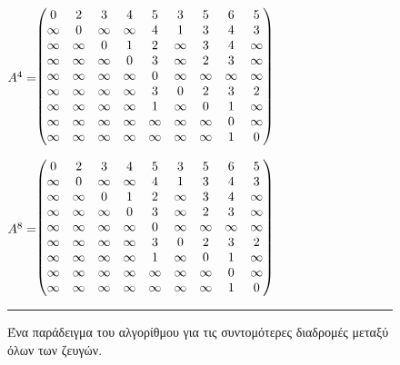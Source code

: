 \documentclass[12pt,a4paper]{article} %
\begin{document}
{\begin{figure}[H]
\centering
\begin{minipage}{0.46\textwidth}
\centering
\footnotesize
$\vcenter{\hbox{$A^4 = $}}\hspace{-0.07cm} \begin{pmatrix}
0 & 2 & 3 & 4 & 5 & 3 & 5 & 6 & 5 \\
\infty & 0 & \infty & \infty & 4 & 1 & 3 & 4 & 3 \\
\infty & \infty & 0 & 1 & 2 & \infty & 3 & 4 & \infty \\
\infty & \infty & \infty & 0 & 3 & \infty & 2 & 3 & \infty \\
\infty & \infty & \infty & \infty & 0 & \infty & \infty & \infty & \infty \\
\infty & \infty & \infty & \infty & 3 & 0 & 2 & 3 & 2 \\
\infty & \infty & \infty & \infty & 1 & \infty & 0 & 1 & \infty \\
\infty & \infty & \infty & \infty & \infty & \infty & \infty & 0 & \infty \\
\infty & \infty & \infty & \infty & \infty & \infty & \infty & 1 & 0
\end{pmatrix}$
\end{minipage}
\hspace{1cm}
\begin{minipage}{0.46\textwidth}
\centering
\footnotesize
$\vcenter{\hbox{$A^8 = $}}\hspace{-0.07cm} \begin{pmatrix}
0 & 2 & 3 & 4 & 5 & 3 & 5 & 6 & 5 \\
\infty & 0 & \infty & \infty & 4 & 1 & 3 & 4 & 3 \\
\infty & \infty & 0 & 1 & 2 & \infty & 3 & 4  & \infty \\
\infty & \infty & \infty & 0 & 3 & \infty & 2 & 3 & \infty \\
\infty & \infty & \infty & \infty & 0 & \infty & \infty & \infty & \infty \\
\infty & \infty & \infty & \infty & 3 & 0 & 2 & 3 & 2 \\
\infty & \infty & \infty & \infty & 1 & \infty & 0 & 1 & \infty \\
\infty & \infty & \infty & \infty & \infty & \infty & \infty & 0 & \infty \\
\infty & \infty & \infty & \infty & \infty & \infty & \infty & 1 & 0
\end{pmatrix}$
\end{minipage}
\vspace{0.3cm}
\noindent\rule{\textwidth}{0.2pt}
\caption{Ένα παράδειγμα του αλγορίθμου για τις συντομότερες διαδρομές μεταξύ όλων των ζευγών.}
\label{fig:graph7}
\end{figure}

}
\end{document}
